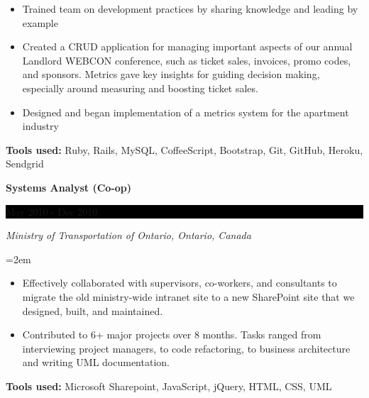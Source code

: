\documentclass[paper=a4,fontsize=11pt]{scrartcl} %
\newcommand{\sepspace}{\vspace*{1em}}   %
\newcommand{\EducationEntry}[4]{
    \noindent \textbf{#1} \hfill      %
    \colorbox{Black}{
      \parbox{8.5em}{
      \hfill\color{White}#2}} \par  %
    \noindent \textit{#3} \par        %
    \noindent\hangindent=2em\hangafter=0 \small #4 %
    \normalsize \par}
\newcommand{\WorkEntry}[4]{       %
    \noindent \textbf{#1} \hfill      %
    \colorbox{Black}{%
      \parbox{9em}{%
      \hfill\color{White}#2}} \par   %
        \noindent \textit{#3} \par        %
    \noindent\hangindent=2em\hangafter=0 \small #4 %
    \normalsize \par}
\begin{document}
{\begin{itemize}
   \item Trained team on development practices by sharing knowledge and leading by example
   \item Created a CRUD application for managing important aspects of our annual Landlord WEBCON conference, such as ticket sales, invoices, promo codes, and sponsors. Metrics gave key insights for guiding decision making, especially around measuring and boosting ticket sales.
   \item Designed and began implementation of a metrics system for the apartment industry
 \end{itemize}
 \textbf{Tools used:} Ruby, Rails, MySQL, CoffeeScript, Bootstrap, Git, GitHub, Heroku, Sendgrid
}
\sepspace

\WorkEntry{Systems Analyst (Co-op)}{May 2010 - Dec 2010}
{Ministry of Transportation of Ontario, Ontario, Canada}
{
 \begin{itemize} \itemsep -1pt
   \item Effectively collaborated with supervisors, co-workers, and
   consultants to migrate the old ministry-wide intranet site to a new
   SharePoint site that we designed, built, and maintained.
   \item Contributed to 6+ major projects over 8 months.
   Tasks ranged from interviewing project managers, to code refactoring,
   to business architecture and writing UML documentation.
 \end{itemize}
 \textbf{Tools used:} Microsoft Sharepoint, JavaScript, jQuery, HTML, CSS, UML
} %
\sepspace
\end{document}
